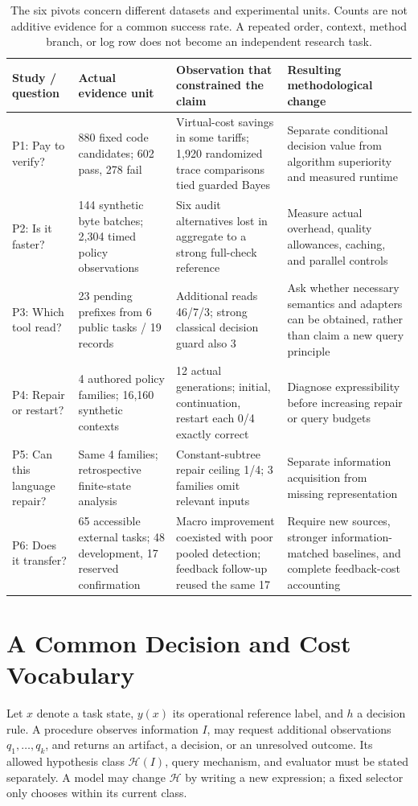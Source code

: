\documentclass[10pt,twocolumn,letterpaper]{article}
\begin{document}
\begin{table}[t]
\centering\small
\setlength{\tabcolsep}{4pt}
\begin{tabular}{p{}p{}p{}p{}}
\toprule
Study / question & Actual evidence unit & Observation that constrained the claim & Resulting methodological change\\
\midrule
P1: Pay to verify? & 880 fixed code candidates; 602 pass, 278 fail & Virtual-cost savings in some tariffs; 1,920 randomized trace comparisons tied guarded Bayes & Separate conditional decision value from algorithm superiority and measured runtime\\
P2: Is it faster? & 144 synthetic byte batches; 2,304 timed policy observations & Six audit alternatives lost in aggregate to a strong full-check reference & Measure actual overhead, quality allowances, caching, and parallel controls\\
P3: Which tool read? & 23 pending prefixes from 6 public tasks / 19 records & Additional reads 46/7/3; strong classical decision guard also 3 & Ask whether necessary semantics and adapters can be obtained, rather than claim a new query principle\\
P4: Repair or restart? & 4 authored policy families; 16,160 synthetic contexts & 12 actual generations; initial, continuation, restart each 0/4 exactly correct & Diagnose expressibility before increasing repair or query budgets\\
P5: Can this language repair? & Same 4 families; retrospective finite-state analysis & Constant-subtree repair ceiling 1/4; 3 families omit relevant inputs & Separate information acquisition from missing representation\\
P6: Does it transfer? & 65 accessible external tasks; 48 development, 17 reserved confirmation & Macro improvement coexisted with poor pooled detection; feedback follow-up reused the same 17 & Require new sources, stronger information-matched baselines, and complete feedback-cost accounting\\
\bottomrule
\end{tabular}
\caption{The six pivots concern different datasets and experimental units. Counts are not additive evidence for a common success rate. A repeated order, context, method branch, or log row does not become an independent research task.}
\label{tab:pivots}
\end{table}

\section{A Common Decision and Cost Vocabulary}
\label{sec:formal}
Let $x$ denote a task state, $y(x)$ its operational reference label, and $h$ a decision rule. A procedure observes information $I$, may request additional observations $q_1,\ldots,q_k$, and returns an artifact, a decision, or an unresolved outcome. Its allowed hypothesis class $\mathcal H(I)$, query mechanism, and evaluator must be stated separately. A model may change $\mathcal H$ by writing a new expression; a fixed selector only chooses within its current class.
\end{document}

